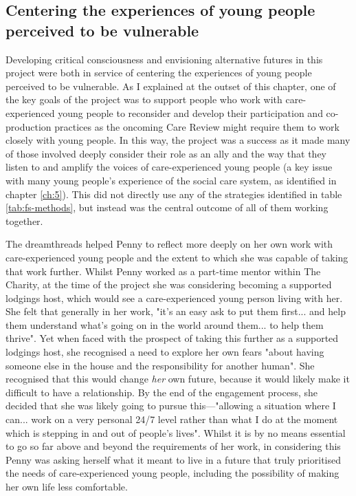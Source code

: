 \subsection{Centering the experiences of young people perceived to be vulnerable}
Developing critical consciousness and envisioning alternative futures in this project were both in service of centering the experiences of young people perceived to be vulnerable. As I explained at the outset of this chapter, one of the key goals of the project was to support people who work with care-experienced young people to reconsider and develop their participation and co-production practices as the oncoming Care Review might require them to work closely with young people. In this way, the project was a success as it made many of those involved deeply consider their role as an ally and the way that they listen to and amplify the voices of care-experienced young people (a key issue with many young people's experience of the social care system, as identified in chapter \ref{ch:5}). This did not directly use any of the strategies identified in table \ref{tab:fs-methods}, but instead was the central outcome of all of them working together. 

The dreamthreads helped Penny to reflect more deeply on her own work with care-experienced young people and the extent to which she was capable of taking that work further. Whilst Penny worked as a part-time mentor within The Charity, at the time of the project she was considering becoming a supported lodgings host, which would see a care-experienced young person living with her. She felt that generally in her work, "it's an easy ask to put them first... and help them understand what's going on in the world around them... to help them thrive". Yet when faced with the prospect of taking this further as a supported lodgings host, she recognised a need to explore her own fears "about having someone else in the house and the responsibility for another human". She recognised that this would change \textit{her} own future, because it would likely make it difficult to have a relationship. By the end of the engagement process, she decided that she was likely going to pursue this—"allowing a situation where I can... work on a very personal 24/7 level rather than what I do at the moment which is stepping in and out of people's lives". Whilst it is by no means essential to go so far above and beyond the requirements of her work, in considering this Penny was asking herself what it meant to live in a future that truly prioritised the needs of care-experienced young people, including the possibility of making her own life less comfortable.

